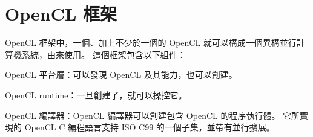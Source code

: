 \section{OpenCL 框架}
OpenCL 框架中，一個、加上不少於一個的 OpenCL 就可以構成一個異構並行計算機系統，由來使用。
這個框架包含以下組件：
\startigBase
\item {\ftEmpha OpenCL 平台層：}可以發現 OpenCL 及其能力，也可以創建。

\item {\ftEmpha OpenCL runtime：}一旦創建了，就可以操控它。

\item {\ftEmpha OpenCL 編譯器：}OpenCL 編譯器可以創建包含 OpenCL 的程序執行體。
它所實現的 OpenCL C 編程語言支持 ISO C99 的一個子集，並帶有並行擴展。
\stopigBase

